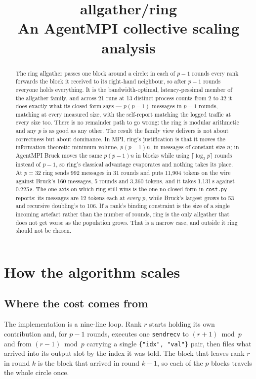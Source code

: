 \documentclass[11pt]{article}
\title{\textbf{allgather/ring}\\[2pt]\large An AgentMPI collective scaling analysis}
\author{}
\date{}
\begin{document}
\maketitle

\begin{abstract}
The ring allgather passes one block around a circle: in each of $p-1$ rounds every rank forwards
the block it received to its right-hand neighbour, so after $p-1$ rounds everyone holds
everything. It is the bandwidth-optimal, latency-pessimal member of the allgather family, and
across 21 runs at 13 distinct process counts from 2 to 32 it does exactly what its closed form
says --- $p(p-1)$
messages in $p-1$ rounds, matching at every measured size, with the self-report matching the
logged traffic at every size too. There is no remainder path to go wrong: the ring is modular
arithmetic and any $p$ is as good as any other. The result the family view delivers is not about
correctness but about dominance. In MPI, ring's justification is that it moves the
information-theoretic minimum volume, $p(p-1)n$, in messages of constant size $n$; in AgentMPI
Bruck moves the same $p(p-1)n$ in blocks while using $\lceil\log_2 p\rceil$ rounds instead of
$p-1$, so ring's classical advantage evaporates and nothing takes its place. At $p=32$ ring sends
992 messages in 31 rounds and puts 11{,}904 tokens on the wire against Bruck's 160 messages, 5
rounds and 3{,}360 tokens, and it takes 1.131\,s against 0.225\,s. The one axis on which ring
still wins is the one no closed form in \texttt{cost.py} reports: its messages are 12 tokens each
at \emph{every} $p$, while Bruck's largest grows to 53 and recursive doubling's to 106. If a
rank's binding constraint is the size of a single incoming artefact rather than the number of
rounds, ring is the only allgather that does not get worse as the population grows. That is a
narrow case, and outside it ring should not be chosen.
\end{abstract}



\section{How the algorithm scales}

\subsection{Where the cost comes from}

The implementation is a nine-line loop. Rank $r$ starts holding its own contribution and, for
$p-1$ rounds, executes one \texttt{sendrecv} to $(r+1) \bmod p$ and from $(r-1) \bmod p$ carrying
a single \texttt{\{"idx", "val"\}} pair, then files what arrived into its output slot by the index
it was told. The block that leaves rank $r$ in round $k$ is the block that arrived in round
$k-1$, so each of the $p$ blocks travels the whole circle once.
\end{document}
